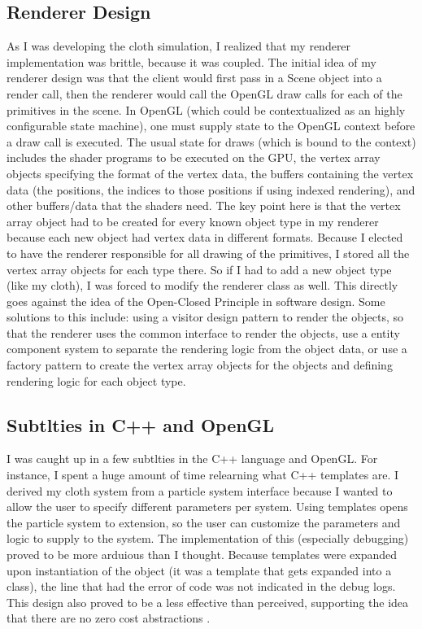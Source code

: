 \documentclass[letterpaper, 10 pt, conference]{ieeeconf}  %
\begin{document}
\subsection{Renderer Design}
        As I was developing the cloth simulation, I realized that my renderer implementation was brittle, because it was coupled. The initial idea of my renderer design was that the client would first pass in a Scene object into a render call, then the renderer would call the OpenGL draw calls for each of the primitives in the scene. In OpenGL (which could be contextualized as an highly configurable state machine), one must supply state to the OpenGL context before a draw call is executed. The usual state for draws (which is bound to the context) includes the shader programs to be executed on the GPU, the vertex array objects specifying the format of the vertex data, the buffers containing the vertex data (the positions, the indices to those positions if using indexed rendering), and other buffers/data that the shaders need. The key point here is that the vertex array object had to be created for every known object type in my renderer because each new object had vertex data in different formats. Because I elected to have the renderer responsible for all drawing of the primitives, I stored all the vertex array objects for each type there. So if I had to add a new object type (like my cloth), I was forced to modify the renderer class as well. This directly goes against the idea of the Open-Closed Principle in software design. Some solutions to this include: using a visitor design pattern to render the objects, so that the renderer uses the common interface to render the objects, use a entity component system to separate the rendering logic from the object data, or use a factory pattern to create the vertex array objects for the objects and defining rendering logic for each object type.


\subsection{Subtlties in C++ and OpenGL}
        I was caught up in a few subtlties in the C++ language and OpenGL. For instance, I spent a huge amount of time relearning what C++ templates are. I derived my cloth system from a particle system interface because I wanted to allow the user to specify different parameters per system. Using templates opens the particle system to extension, so the user can customize the parameters and logic to supply to the system. The implementation of this (especially debugging) proved to be more arduious than I thought. Because templates were expanded upon instantiation of the object (it was a template that gets expanded into a class), the line that had the error of code was not indicated in the debug logs. This design also proved to be a less effective than perceived, supporting the idea that there are no zero cost abstractions \cite{caruth2019}. 
\end{document}
